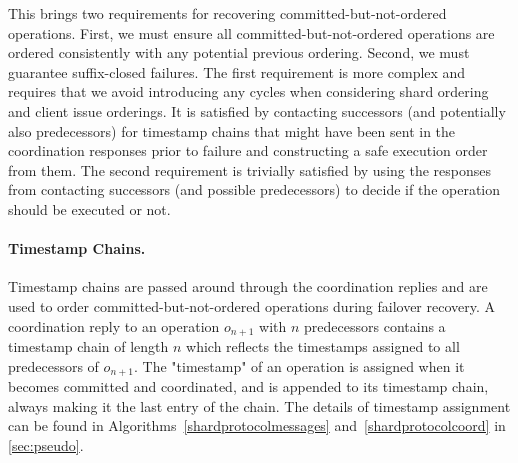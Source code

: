This brings two requirements for recovering committed-but-not-ordered operations.
%
First, we must ensure all committed-but-not-ordered operations are ordered consistently with any potential previous ordering.
Second, we must guarantee suffix-closed failures.
The first requirement is more complex and requires that we avoid introducing any cycles when considering shard ordering and client issue orderings. It is satisfied by contacting successors (and potentially also predecessors) for timestamp chains that might have been sent in the coordination responses prior to failure and constructing a safe execution order from them.
The second requirement is trivially satisfied by using the responses from contacting successors (and possible predecessors) to decide if the operation should be executed or not.


\paragraph{Timestamp Chains.}

Timestamp chains are passed around through the coordination replies and are used to order committed-but-not-ordered operations during failover recovery. A coordination reply to an operation $o_{n+1}$ with $n$ predecessors contains a timestamp chain of length $n$ which reflects the timestamps assigned to all predecessors of $o_{n+1}$. The "timestamp" of an operation is assigned when it becomes committed and coordinated, and is appended to its timestamp chain, always making it the last entry of the chain. The details of timestamp assignment can be found in Algorithms~\ref{shardprotocolmessages} and~\ref{shardprotocolcoord} in \cref{sec:pseudo}.

